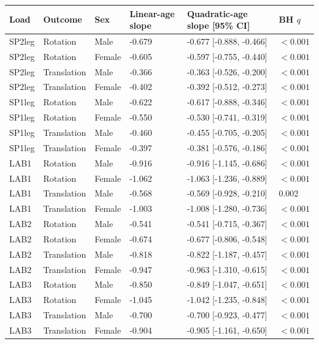 \begin{tabular}{llllll}
\toprule
Load & Outcome & Sex & Linear-age slope & Quadratic-age slope [95\% CI] & BH $q$ \\
\midrule
SP2leg & Rotation & Male & -0.679 & -0.677 [-0.888, -0.466] & $<0.001$ \\
SP2leg & Rotation & Female & -0.605 & -0.597 [-0.755, -0.440] & $<0.001$ \\
SP2leg & Translation & Male & -0.366 & -0.363 [-0.526, -0.200] & $<0.001$ \\
SP2leg & Translation & Female & -0.402 & -0.392 [-0.512, -0.273] & $<0.001$ \\
SP1leg & Rotation & Male & -0.622 & -0.617 [-0.888, -0.346] & $<0.001$ \\
SP1leg & Rotation & Female & -0.550 & -0.530 [-0.741, -0.319] & $<0.001$ \\
SP1leg & Translation & Male & -0.460 & -0.455 [-0.705, -0.205] & $<0.001$ \\
SP1leg & Translation & Female & -0.397 & -0.381 [-0.576, -0.186] & $<0.001$ \\
LAB1 & Rotation & Male & -0.916 & -0.916 [-1.145, -0.686] & $<0.001$ \\
LAB1 & Rotation & Female & -1.062 & -1.063 [-1.236, -0.889] & $<0.001$ \\
LAB1 & Translation & Male & -0.568 & -0.569 [-0.928, -0.210] & 0.002 \\
LAB1 & Translation & Female & -1.003 & -1.008 [-1.280, -0.736] & $<0.001$ \\
LAB2 & Rotation & Male & -0.541 & -0.541 [-0.715, -0.367] & $<0.001$ \\
LAB2 & Rotation & Female & -0.674 & -0.677 [-0.806, -0.548] & $<0.001$ \\
LAB2 & Translation & Male & -0.818 & -0.822 [-1.187, -0.457] & $<0.001$ \\
LAB2 & Translation & Female & -0.947 & -0.963 [-1.310, -0.615] & $<0.001$ \\
LAB3 & Rotation & Male & -0.850 & -0.849 [-1.047, -0.651] & $<0.001$ \\
LAB3 & Rotation & Female & -1.045 & -1.042 [-1.235, -0.848] & $<0.001$ \\
LAB3 & Translation & Male & -0.700 & -0.700 [-0.923, -0.477] & $<0.001$ \\
LAB3 & Translation & Female & -0.904 & -0.905 [-1.161, -0.650] & $<0.001$ \\
\bottomrule
\end{tabular}
